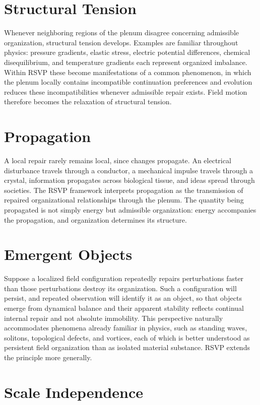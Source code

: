 \documentclass[11pt,oneside]{book}
\numberwithin{equation}{chapter}
\theoremstyle{definition}
\theoremstyle{plain}
\begin{document}
\section{Structural Tension}

Whenever neighboring regions of the plenum disagree concerning admissible organization, structural tension develops. Examples are familiar throughout physics: pressure gradients, elastic stress, electric potential differences, chemical disequilibrium, and temperature gradients each represent organized imbalance. Within RSVP these become manifestations of a common phenomenon, in which the plenum locally contains incompatible continuation preferences and evolution reduces these incompatibilities whenever admissible repair exists. Field motion therefore becomes the relaxation of structural tension.

\section{Propagation}

A local repair rarely remains local, since changes propagate. An electrical disturbance travels through a conductor, a mechanical impulse travels through a crystal, information propagates across biological tissue, and ideas spread through societies. The RSVP framework interprets propagation as the transmission of repaired organizational relationships through the plenum. The quantity being propagated is not simply energy but admissible organization: energy accompanies the propagation, and organization determines its structure.

\section{Emergent Objects}

Suppose a localized field configuration repeatedly repairs perturbations faster than those perturbations destroy its organization. Such a configuration will persist, and repeated observation will identify it as an object, so that objects emerge from dynamical balance and their apparent stability reflects continual internal repair and not absolute immobility. This perspective naturally accommodates phenomena already familiar in physics, such as standing waves, solitons, topological defects, and vortices, each of which is better understood as persistent field organization than as isolated material substance. RSVP extends the principle more generally.

\section{Scale Independence}
\end{document}
